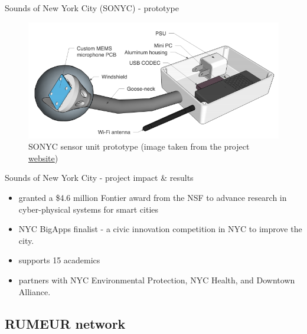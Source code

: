\documentclass{beamer}
\newcommand{\myhref}[2]{{\color{blue}\href{#1}{#2}}}
\begin{document}
    \begin{frame}{Sounds of New York City (SONYC) - prototype}
        \begin{center} 
            \begin{figure}
                \includegraphics[scale=0.5]{figures/sonyc_prototype}
                \caption{SONYC sensor unit prototype (image taken from the project \myhref{https://wp.nyu.edu/sonyc}{website})}
            \end{figure}
        \end{center}
    \end{frame}
    
    \begin{frame}{Sounds of New York City - project impact \& results}
        \begin{itemize}
            \item granted a \$4.6 million Fontier award from the NSF to advance research in cyber-physical systems for smart cities
            \item NYC BigApps finalist - a civic innovation competition in NYC to improve the city.
            \item supports 15 academics
            \item partners with NYC Environmental Protection, NYC Health, and Downtown Alliance.
        \end{itemize}
    \end{frame}
        
    \subsection{RUMEUR network}
\end{document}

